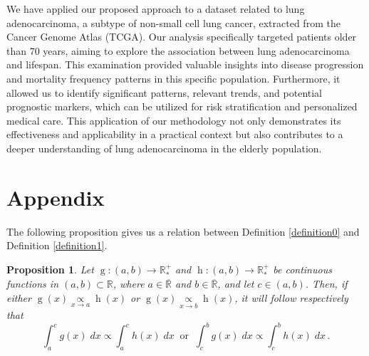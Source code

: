 \documentclass[12pt]{article} %
\newcommand{\f}{\operatorname}
\theoremstyle{plain}%
\newtheorem{proposition}[theorem]{Proposition}
\theoremstyle{definition}
\theoremstyle{remark}
\begin{document}
We have applied our proposed approach to a dataset related to lung adenocarcinoma, a subtype of non-small cell lung cancer, extracted from the Cancer Genome Atlas (TCGA). Our analysis specifically targeted patients older than 70 years, aiming to explore the association between lung adenocarcinoma and lifespan. This examination provided valuable insights into disease progression and mortality frequency patterns in this specific population. Furthermore, it allowed us to identify significant patterns, relevant trends, and potential prognostic markers, which can be utilized for risk stratification and personalized medical care. This application of our methodology not only demonstrates its effectiveness and applicability in a practical context but also contributes to a deeper understanding of lung adenocarcinoma in the elderly population.






\appendix




\section{Appendix}

The following proposition gives us a relation between Definition \ref{definition0} and Definition \ref{definition1}.

\begin{proposition}\label{proportional2} Let $\f{g}:(a,b)\to\mathbb{R^+_*}$ and $\f{h}:(a,b)\to\mathbb{R^+_*}$ be continuous functions in $(a,b)\subset\mathbb{R}$, where $a\in\overline{\mathbb{R}}$ and $b\in\overline{\mathbb{R}}$, and let $c\in(a,b)$. Then, if either $\f{g}(x)\underset{x\to a}{\propto} \f{h}(x)$ or $\f{g}(x)\underset{x\to b}{\propto} \f{h}(x)$, it will follow respectively that
\begin{equation*}
\int_a^c g(x)\; dx \propto \int_a^c h(x)\; dx\ \mbox{ or }\ \int_c^b g(x)\; dx \propto \int_c^b h(x)\; dx \,.
\end{equation*}
\end{proposition} 
\end{document}

